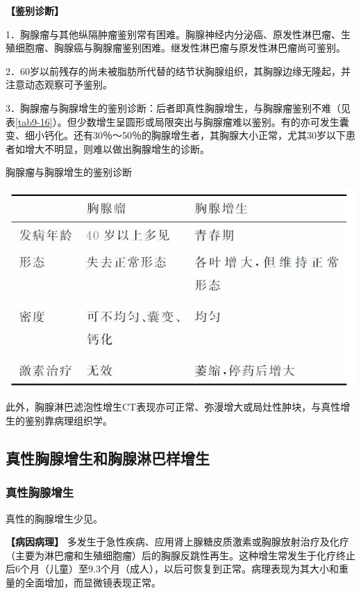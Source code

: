 \textbf{【鉴别诊断】}

1．胸腺瘤与其他纵隔肿瘤鉴别常有困难。胸腺神经内分泌癌、原发性淋巴瘤、生殖细胞瘤、胸腺癌与胸腺瘤鉴别困难。继发性淋巴瘤与原发性淋巴瘤尚可鉴别。

2．60岁以前残存的尚未被脂肪所代替的结节状胸腺组织，其胸腺边缘无隆起，并注意动态观察可予鉴别。

3．胸腺瘤与胸腺增生的鉴别诊断：后者即真性胸腺增生，与胸腺瘤鉴别不难（见表\ref{tab9-16}）。但少数增生呈圆形或局限突出与胸腺瘤难以鉴别。有的亦可发生囊变、细小钙化。还有30％～50％的胸腺增生者，其胸腺大小正常，尤其30岁以下患者如增大不明显，则难以做出胸腺增生的诊断。

\begin{table}[htbp]
\centering
\caption{胸腺瘤与胸腺增生的鉴别诊断}
\label{tab9-16}
\includegraphics[width=\textwidth,height=\textheight,keepaspectratio]{./images/Image00256.jpg}
\end{table}

此外，胸腺淋巴滤泡性增生CT表现亦可正常、弥漫增大或局灶性肿块，与真性增生的鉴别靠病理组织学。

\subsection{真性胸腺增生和胸腺淋巴样增生}

\subsubsection{真性胸腺增生}

真性的胸腺增生少见。

\textbf{【病因病理】}
多发生于急性疾病、应用肾上腺糖皮质激素或胸腺放射治疗及化疗（主要为淋巴瘤和生殖细胞瘤）后的胸腺反跳性再生。这种增生常发生于化疗终止后6个月（儿童）至9.3个月（成人），以后可恢复到正常。病理表现为其大小和重量的全面增加，而显微镜表现正常。

